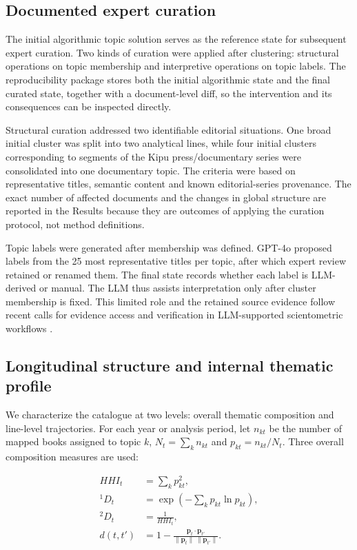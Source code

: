 \documentclass[futureinternet,article,submit,moreauthors]{Definitions/mdpi}
\begin{document}
\subsection{Documented expert curation}\label{subsec:curation}

The initial algorithmic topic solution serves as the reference state for subsequent expert curation. Two kinds of curation were applied after clustering: structural operations on topic membership and interpretive operations on topic labels. The reproducibility package stores both the initial algorithmic state and the final curated state, together with a document-level diff, so the intervention and its consequences can be inspected directly.

Structural curation addressed two identifiable editorial situations. One broad initial cluster was split into two analytical lines, while four initial clusters corresponding to segments of the Kipu press/documentary series were consolidated into one documentary topic. The criteria were based on representative titles, semantic content and known editorial-series provenance. The exact number of affected documents and the changes in global structure are reported in the Results because they are outcomes of applying the curation protocol, not method definitions.

Topic labels were generated after membership was defined. GPT-4o proposed labels from the 25 most representative titles per topic, after which expert review retained or renamed them. The final state records whether each label is LLM-derived or manual. The LLM thus assists interpretation only after cluster membership is fixed. This limited role and the retained source evidence follow recent calls for evidence access and verification in LLM-supported scientometric workflows \citep{lee2026evidence}.

\subsection{Longitudinal structure and internal thematic profile}\label{subsec:longmetrics}

We characterize the catalogue at two levels: overall thematic composition and line-level trajectories. For each year or analysis period, let $n_{kt}$ be the number of mapped books assigned to topic $k$, $N_t=\sum_k n_{kt}$ and $p_{kt}=n_{kt}/N_t$. Three overall composition measures are used:

\begin{align}
HHI_t &= \sum_k p_{kt}^{2}, \\
{}^{1}D_t &= \exp\!\left(-\sum_k p_{kt}\ln p_{kt}\right), \\
{}^{2}D_t &= \frac{1}{HHI_t}, \\
d(t,t') &= 1-\frac{\mathbf{p}_t\cdot\mathbf{p}_{t'}}{\|\mathbf{p}_t\|\,\|\mathbf{p}_{t'}\|}.
\label{eq:composition}
\end{align}
\end{document}

